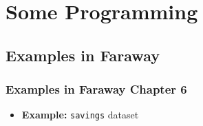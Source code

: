 \documentclass[serif,mathserif,professionalfont]{beamer}
\begin{document}
%	
%	
%	






\section{Some Programming}


\subsection{Examples in Faraway}



\begin{frame}
	
	\frametitle{Examples in Faraway Chapter 6}
	
	
	\begin{itemize}
		\item \textbf{Example:} \texttt{savings} dataset
	\end{itemize}
	
	
	
\end{frame}
\end{document}
